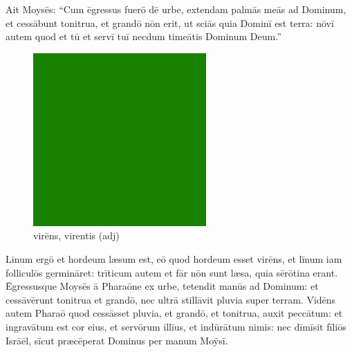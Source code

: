 Ait Moysēs: ``Cum ēgressus fuerō
dē urbe, extendam palmās meās ad Dominum, et cessābunt tonitrua, et grandō
nōn erit, ut sciās quia Dominī est terra: nōvī autem quod et tū et
servī tuī necdum timeātis Dominum Deum.'' 

\begin{figure}[hp]
    \centering
    \includegraphics{green}
    \caption{virēns, virentis (adj)}
\end{figure}

Linum ergō et hordeum læsum est, eō quod
hordeum esset virēns, et līnum iam
folliculōs
germināret:  trīticum autem et
fār nōn sunt læsa, quia sērōtina erant. 
Ēgressusque Moysēs ā Pharaōne ex urbe, tetendit manūs ad Dominum: et
cessāvērunt tonitrua et grandō, nec ultrā stillāvit
pluvia super terram.  Vidēns autem Pharaō quod cessāsset
pluvia, et grandō, et tonitrua, auxit peccātum:  et
ingravātum est cor eius, et servōrum illīus, et indūrātum nimis: nec
dīmīsit fīliōs Isrāēl, sīcut præcēperat Dominus
per manum Moȳsī.
